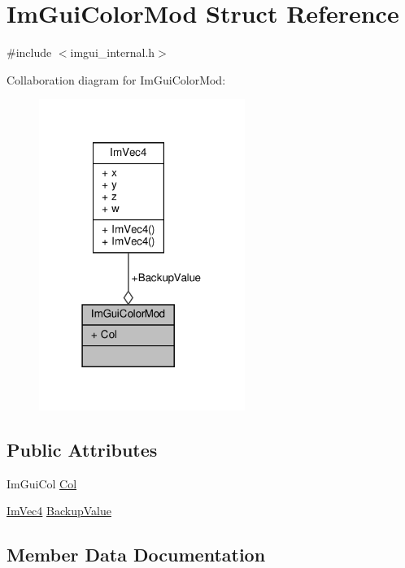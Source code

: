 \hypertarget{structImGuiColorMod}{}\section{Im\+Gui\+Color\+Mod Struct Reference}
\label{structImGuiColorMod}


{\ttfamily \#include $<$imgui\+\_\+internal.\+h$>$}



Collaboration diagram for Im\+Gui\+Color\+Mod\+:
\nopagebreak
\begin{figure}[H]
\begin{center}
\leavevmode
\includegraphics[width=190pt]{structImGuiColorMod__coll__graph}
\end{center}
\end{figure}
\subsection*{Public Attributes}
\begin{DoxyCompactItemize}
\item 
Im\+Gui\+Col \hyperlink{structImGuiColorMod_a211171bd30d39348fc9b91289d253e1c}{Col}
\item 
\hyperlink{structImVec4}{Im\+Vec4} \hyperlink{structImGuiColorMod_a99134f8cabbe0c2c45bf7d693bd6dae7}{Backup\+Value}
\end{DoxyCompactItemize}


\subsection{Member Data Documentation}
\mbox{\label{structImGuiColorMod_a99134f8cabbe0c2c45bf7d693bd6dae7}} 
